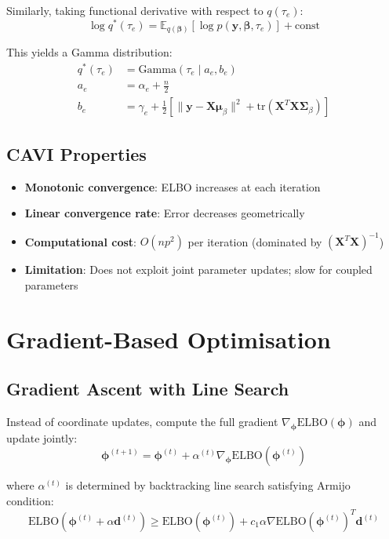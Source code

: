 \documentclass[11pt]{article}
\newcommand{\E}{\mathbb{E}}
\newcommand{\ELBO}{\text{ELBO}}
\newcommand{\tr}{\text{tr}}
\begin{document}
Similarly, taking functional derivative with respect to $q(\tau_e)$:
\begin{equation}
\log q^*(\tau_e) = \E_{q(\bm{\beta})}[\log p(\bm{y}, \bm{\beta}, \tau_e)] + \text{const}
\end{equation}

This yields a Gamma distribution:
\begin{align}
q^*(\tau_e) &= \text{Gamma}(\tau_e \mid a_e, b_e)\\
a_e &= \alpha_e + \frac{n}{2} \label{eq:cavi_a}\\
b_e &= \gamma_e + \frac{1}{2}\left[\|\bm{y} - \bm{X}\bm{\mu}_\beta\|^2 + \tr(\bm{X}^T\bm{X}\bm{\Sigma}_\beta)\right] \label{eq:cavi_b}
\end{align}

\subsection{CAVI Properties}

\begin{itemize}
\item \textbf{Monotonic convergence}: ELBO increases at each iteration
\item \textbf{Linear convergence rate}: Error decreases geometrically
\item \textbf{Computational cost}: $O(np^2)$ per iteration (dominated by $({\bm{X}^T\bm{X}})^{-1}$)
\item \textbf{Limitation}: Does not exploit joint parameter updates; slow for coupled parameters
\end{itemize}

\section{Gradient-Based Optimisation}

\subsection{Gradient Ascent with Line Search}

Instead of coordinate updates, compute the full gradient $\nabla_{\bm{\phi}} \ELBO(\bm{\phi})$ and update jointly:
\begin{equation}
\bm{\phi}^{(t+1)} = \bm{\phi}^{(t)} + \alpha^{(t)} \nabla_{\bm{\phi}} \ELBO(\bm{\phi}^{(t)})
\end{equation}

where $\alpha^{(t)}$ is determined by backtracking line search satisfying Armijo condition:
\begin{equation}
\ELBO(\bm{\phi}^{(t)} + \alpha \bm{d}^{(t)}) \geq \ELBO(\bm{\phi}^{(t)}) + c_1 \alpha \nabla \ELBO(\bm{\phi}^{(t)})^T \bm{d}^{(t)}
\end{equation}
\end{document}
